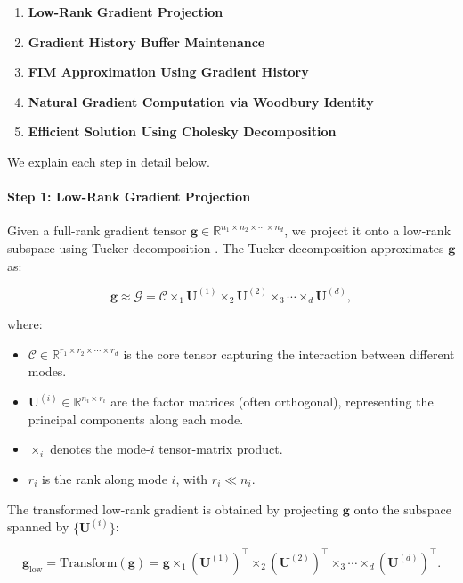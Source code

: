 \begin{enumerate}
    \item \textbf{Low-Rank Gradient Projection}
    \item \textbf{Gradient History Buffer Maintenance}
    \item \textbf{FIM Approximation Using Gradient History}
    \item \textbf{Natural Gradient Computation via Woodbury Identity}
    \item \textbf{Efficient Solution Using Cholesky Decomposition}
\end{enumerate}

We explain each step in detail below.

\paragraph{Step 1: Low-Rank Gradient Projection}



Given a full-rank gradient tensor $\mathbf{g} \in \mathbb{R}^{n_1 \times n_2 \times \cdots \times n_d}$, we project it onto a low-rank subspace using Tucker decomposition \citep{tuckerMathematicalNotesThree1966}. The Tucker decomposition approximates $\mathbf{g}$ as:

\[
\mathbf{g} \approx \mathcal{G} = \mathcal{C} \times_1 \mathbf{U}^{(1)} \times_2 \mathbf{U}^{(2)} \times_3 \cdots \times_d \mathbf{U}^{(d)},
\]

where:

\begin{itemize}
    \item $\mathcal{C} \in \mathbb{R}^{r_1 \times r_2 \times \cdots \times r_d}$ is the core tensor capturing the interaction between different modes.
    \item $\mathbf{U}^{(i)} \in \mathbb{R}^{n_i \times r_i}$ are the factor matrices (often orthogonal), representing the principal components along each mode.
    \item $\times_i$ denotes the mode-$i$ tensor-matrix product.
    \item $r_i$ is the rank along mode $i$, with $r_i \ll n_i$.
\end{itemize}

The transformed low-rank gradient is obtained by projecting $\mathbf{g}$ onto the subspace spanned by $\{\mathbf{U}^{(i)}\}$:

\[
\mathbf{g}_{\text{low}} = \text{Transform}(\mathbf{g}) = \mathbf{g} \times_1 (\mathbf{U}^{(1)})^\top \times_2 (\mathbf{U}^{(2)})^\top \times_3 \cdots \times_d (\mathbf{U}^{(d)})^\top.
\]

